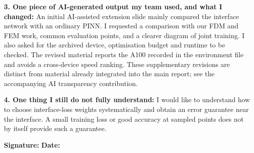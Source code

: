 \documentclass[10pt]{article}
\begin{document}
\begin{formbox}
\textbf{3. One piece of AI-generated output my team used, and what I changed:}
An initial AI-assisted extension slide mainly compared the interface network
with an ordinary PINN. I requested a comparison with our FDM and FEM work,
common evaluation points, and a clearer diagram of joint training. I also
asked for the archived device, optimisation budget and runtime to be
checked. The revised material reports the A100 recorded in the environment
file and avoids a cross-device speed ranking. These supplementary revisions
are distinct from material already integrated into the main report; see
the accompanying AI transparency contribution.

\textbf{4. One thing I still do not fully understand:}
I would like to understand how to choose interface-loss weights
systematically and obtain an error guarantee near the interface. A small
training loss or good accuracy at sampled points does not by itself provide
such a guarantee.

\vfill
\textbf{Signature:} \underline{\hspace{4.5cm}} \hfill
\textbf{Date:} \underline{\hspace{2.5cm}}
\end{formbox}
\end{document}
